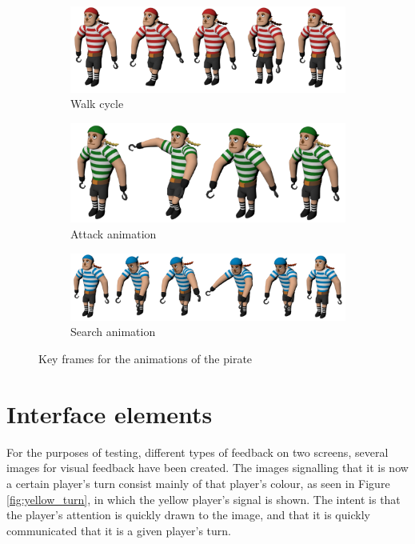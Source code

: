 \begin{figure}[h!]
	\centering
	\begin{subfigure}[b]{\textwidth}
		\centering
		\includegraphics[scale=0.2]{figures/walk_cycle.png}
		\caption{Walk cycle}
		\label{fig:walk_cycle}
	\end{subfigure}
	
	\begin{subfigure}[b]{\textwidth}
		\centering
		\includegraphics[scale=0.2]{figures/attack_anim.png}
		\caption{Attack animation}
		\label{fig:attack_anim}
	\end{subfigure}
	
	\begin{subfigure}[b]{\textwidth}
		\centering
		\includegraphics[scale=0.2]{figures/search_anim.png}
		\caption{Search animation}
		\label{fig:search_anim}
	\end{subfigure}
	\caption{Key frames for the animations of the pirate}
	\label{fig:key_frames}
\end{figure}

\section{Interface elements}
For the purposes of testing, different types of feedback on two screens, several images for visual feedback have been created. The images signalling that it is now a certain player's turn consist mainly of that player's colour, as seen in Figure \ref{fig:yellow_turn}, in which the yellow player's signal is shown. The intent is that the player's attention is quickly drawn to the image, and that it is quickly communicated that it is a given player's turn.

